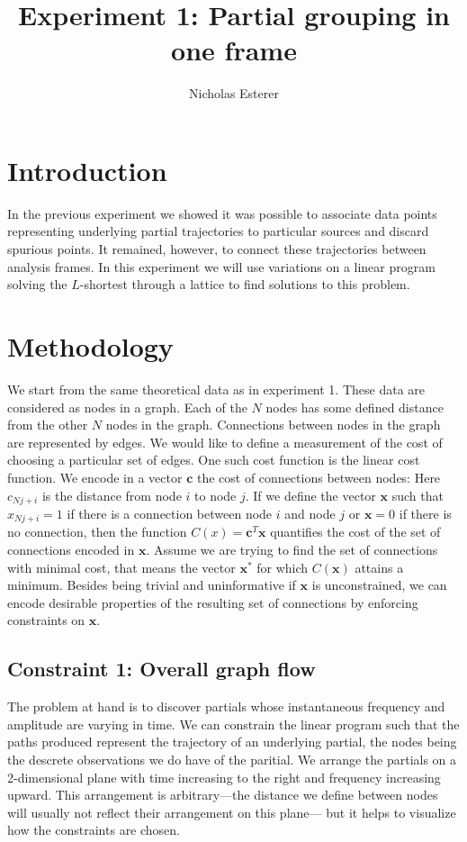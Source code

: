 \documentclass[letterpaper,12pt]{report}
\begin{document}
\author{Nicholas Esterer}
\title{Experiment 1: Partial grouping in one frame}
\maketitle
\tableofcontents

\section{Introduction}
In the previous experiment we showed it was possible to associate data points
representing underlying partial trajectories to particular sources and discard
spurious points. It remained, however, to connect these trajectories between
analysis frames. In this experiment we will use variations on a linear program
solving the $L$-shortest through a lattice to find solutions to this problem.

\section{Methodology}
We start from the same theoretical data as in experiment 1. These data are
considered as nodes in a graph. Each of the $N$ nodes has some defined distance
from the other $N$ nodes in the graph. Connections between nodes in the graph
are represented by edges. We would like to define a measurement of the cost of
choosing a particular set of edges. One such cost function is the linear cost
function. We encode in a vector $\mathbf{c}$ the cost of connections between
nodes: Here $c_{Nj+i}$ is the distance from node $i$ to node $j$. If we define
the vector $\mathbf{x}$ such that $x_{Nj+i} = 1$ if there is a connection
between node $i$ and node $j$ or $\mathbf{x} = 0$ if there is no connection,
then the function $C(x) = \mathbf{c}^T\mathbf{x}$ quantifies the cost of the set
of connections encoded in $\mathbf{x}$. Assume we are trying to find the set of
connections with minimal cost, that means the vector $\mathbf{x}^{\ast}$ for
which $C(\mathbf{x})$ attains a minimum. Besides being trivial and
uninformative if $\mathbf{x}$ is unconstrained, we can encode desirable
properties of the resulting set of connections by enforcing constraints on
$\mathbf{x}$.

\subsection{Constraint 1: Overall graph flow}
The problem at hand is to discover partials whose instantaneous frequency and
amplitude are varying in time. We can constrain the linear program such that the
paths produced represent the trajectory of an underlying partial, the nodes
being the descrete observations we do have of the paritial. We arrange the
partials on a 2-dimensional plane with time increasing to the right and
frequency increasing upward. This arrangement is arbitrary---the distance we
define between nodes will usually not reflect their arrangement on this plane---
but it helps to visualize how the constraints are chosen.
\end{document}
